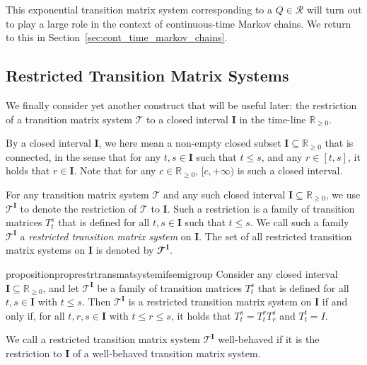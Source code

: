 \documentclass[10pt,a4paper]{paper}
\theoremstyle{definition}
\newcommand{\reals}{\mathbb{R}}
\newcommand{\realsnonneg}{\reals_{\geq 0}}
\begin{document}
This exponential transition matrix system corresponding to a $Q\in\mathcal{R}$ will turn out to play a large role in the context of continuous-time Markov chains. We return to this in Section~\ref{sec:cont_time_markov_chains}.

\subsection{Restricted Transition Matrix Systems}\label{sec:restricted}

We finally consider yet another construct that will be useful later: the restriction of a transition matrix system $\mathcal{T}$ to a closed interval $\mathbf{I}$ in the time-line $\realsnonneg$. \label{notation:restricted_system}

By a closed interval $\mathbf{I}$, we here mean a non-empty closed subset $\mathbf{I}\subseteq\realsnonneg$ that is connected, in the sense that for any $t,s\in\mathbf{I}$ such that $t\leq s$, and any $r\in[t,s]$, it holds that $r\in\mathbf{I}$. Note that for any $c\in\realsnonneg$, $[c,+\infty)$ is such a closed interval.

For any transition matrix system $\mathcal{T}$ and any such closed interval $\mathbf{I}\subseteq\realsnonneg$, we use $\mathcal{T}^\mathbf{I}$ to denote the restriction of $\mathcal{T}$ to $\mathbf{I}$. Such a restriction is a family of transition matrices $T_t^s$ that is defined for all $t,s\in\mathbf{I}$ such that $t\leq s$.
We call such a family $\mathcal{T}^{\mathbf{I}}$ a \emph{restricted transition matrix system} on $\mathbf{I}$. The set of all restricted transition matrix systems on $\mathbf{I}$ is denoted by $\mathbfcal{T}^{\mathbf{I}}$.


\begin{restatable}{proposition}{proprestrtransmatsystemifsemigroup}
\label{prop:restr_trans_mat_system_if_semigroup}
Consider any closed interval $\mathbf{I}\subseteq\realsnonneg$, and let $\mathcal{T}^{\mathbf{I}}$ be a family of transition matrices $T_t^s$ that is defined for all $t,s\in\mathbf{I}$ with $t\leq s$. Then $\mathcal{T}^{\mathbf{I}}$ is a restricted transition matrix system on $\mathbf{I}$ if and only if, for all $t,r,s\in\mathbf{I}$ with $t\leq r\leq s$, it holds that $T_t^s = T_t^rT_r^s$ and $T_t^t=I$.
\end{restatable}

We call a restricted transition matrix system $\mathcal{T}^{\mathbf{I}}$ well-behaved if it is the restriction to $\mathbf{I}$ of a well-behaved transition matrix system.
\end{document}
